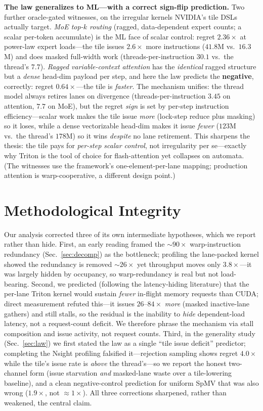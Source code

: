 \documentclass[conference]{IEEEtran}
\begin{document}
\textbf{The law generalizes to ML---with a correct sign-flip prediction.} Two further oracle-gated
witnesses, on the irregular kernels NVIDIA's tile DSLs actually target. \emph{MoE top-$k$ routing}
(ragged, data-dependent expert counts; a scalar per-token accumulate) is the ML face of scalar control:
regret $2.36\times$ at power-law expert loads---the tile issues $2.6\times$ more instructions ($41.8$M
vs.\ $16.3$M) and does masked full-width work (threads-per-instruction $30.1$ vs.\ the thread's $7.7$).
\emph{Ragged variable-context attention} has the \emph{identical} ragged structure but a \emph{dense}
head-dim payload per step, and here the law predicts the \textbf{negative}, correctly: regret
$0.64\times$---the tile is \emph{faster}. The mechanism unifies: the thread model always retires lanes
on divergence (threads-per-instruction $3.45$ on attention, $7.7$ on MoE), but the regret \emph{sign} is
set by per-step instruction efficiency---scalar work makes the tile issue \emph{more} (lock-step reduce
plus masking) so it loses, while a dense vectorizable head-dim makes it issue \emph{fewer} ($123$M vs.\
the thread's $178$M) so it wins \emph{despite} no lane retirement. This sharpens the thesis: the tile
pays for \emph{per-step scalar control}, not irregularity per se---exactly why Triton is the tool of
choice for flash-attention yet collapses on automata. (The witnesses use the framework's
one-element-per-lane mapping; production attention is warp-cooperative, a different design point.)

\section{Methodological Integrity}
Our analysis corrected three of its own intermediate hypotheses, which we report rather than hide.
First, an early reading framed the ${\sim}90\times$ warp-instruction redundancy (Sec.~\ref{sec:decomp})
as the bottleneck; profiling the lane-packed kernel showed the redundancy is removed ${\sim}26\times$
yet throughput moves only $3.8\times$---it was largely hidden by occupancy, so warp-redundancy is real
but not load-bearing. Second, we predicted (following the latency-hiding literature) that the per-lane
Triton kernel would sustain \emph{fewer} in-flight memory requests than CUDA; direct measurement
refuted this---it issues $26$--$84\times$ \emph{more} (masked inactive-lane gathers) and still stalls,
so the residual is the inability to \emph{hide} dependent-load latency, not a request-count deficit.
We therefore phrase the mechanism via stall composition and issue activity, not request counts. Third,
in the generality study (Sec.~\ref{sec:law}) we first stated the law as a single ``tile issue deficit''
predictor; completing the Nsight profiling falsified it---rejection sampling shows regret $4.0\times$
while the tile's issue rate is \emph{above} the thread's---so we report the honest two-channel form
(issue starvation \emph{and} masked-lane waste over a tile-lowering baseline), and a clean
negative-control prediction for uniform SpMV that was also wrong ($1.9\times$, not ${\approx}1\times$).
All three corrections sharpened, rather than weakened, the central claim.
\end{document}
